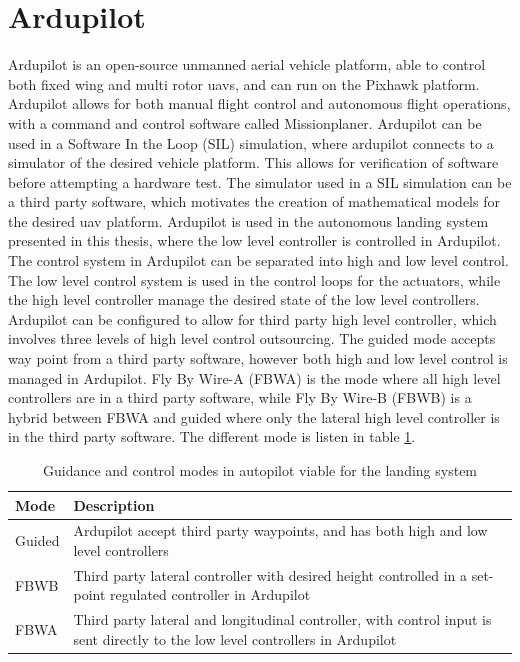 \section{Ardupilot}\label{ss:ardupilot}
Ardupilot is an open-source unmanned aerial vehicle platform, able to control both fixed wing and multi rotor \glspl{uav}, and can run on the Pixhawk platform. Ardupilot allows for both manual flight control and autonomous flight operations, with a command and control software called Missionplaner. Ardupilot can be used in a Software In the Loop (SIL) simulation, where ardupilot connects to a simulator of the desired vehicle platform. This allows for verification of software before attempting a hardware test. The simulator used in a SIL simulation can be a third party software, which motivates the creation of mathematical models for the desired \gls{uav} platform. Ardupilot is used in the autonomous landing system presented in this thesis, where the low level controller is controlled in Ardupilot. The control system in Ardupilot can be separated into high and low level control. The low level control system is used in the control loops for the actuators, while the high level controller manage the desired state of the low level controllers. Ardupilot can be configured to allow for third party high level controller, which involves three levels of high level control outsourcing. The guided mode accepts way point from a third party software, however both high and low level control is managed in Ardupilot. Fly By Wire-A (FBWA) is the mode where all high level controllers are in a third party software, while Fly By Wire-B (FBWB) is a hybrid between FBWA and guided where only the lateral high level controller is in the third party software. The different mode is listen in table \ref{tb:ArduPilotMode}.
\begin{table}[H]
\centering
\begin{tabular}{| p{3cm} | p{5cm}|}
\hline
\textbf{Mode}	&	\textbf{Description} \\ \hline
Guided			& Ardupilot accept third party waypoints, and has both high and low level controllers										\\ \hline
FBWB			& Third party lateral controller with desired height controlled in a set-point regulated controller in Ardupilot \\ \hline
FBWA			& Third party lateral and longitudinal controller, with control input is sent directly to the low level controllers in Ardupilot 	\\ \hline
\end{tabular}
\caption{Guidance and control modes in autopilot viable for the landing system}
\label{tb:ArduPilotMode}
\end{table}

